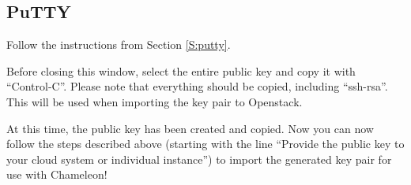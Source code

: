 \subsection{PuTTY}

Follow the instructions from Section \ref{S:putty}. 

Before closing this window, select the entire public key and copy it
with ``Control-C''. Please note that everything should be copied,
including ``ssh-rsa''. This will be used when importing the key pair to
Openstack.

At this time, the public key has been created and copied. Now you can
now follow the steps described above (starting with the line ``Provide
the public key to your cloud system or individual instance'') to import
the generated key pair for use with Chameleon!
